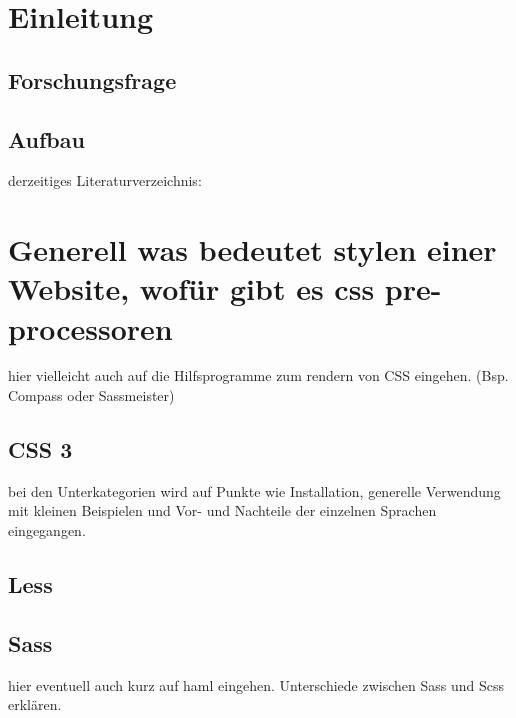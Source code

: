 \section{Einleitung}
\label{section:Introduction}


\subsection{Forschungsfrage}
\label{subsection:Coding}


\subsection{Aufbau}
derzeitiges Literaturverzeichnis:\newline
\autocite[]{Bracey.2014}\newline
\autocite[]{Coyier.2012}\newline
\autocite[]{Croom.2012}\newline
\autocite[]{Firdaus.}\newline
\autocite[]{Hixon.2011}\newline
\autocite[]{Page.2013}\newline
\autocite[]{ZingDesign.2014}\newline


\section{Generell was bedeutet stylen einer Website, wofür gibt es css pre-processoren}
\label{section:MathematicalStuff}
hier vielleicht auch auf die Hilfsprogramme zum rendern von CSS eingehen. (Bsp. Compass oder Sassmeister)


\subsection{CSS 3}
bei den Unterkategorien wird auf Punkte wie Installation, generelle Verwendung mit kleinen Beispielen und Vor- und Nachteile der einzelnen Sprachen eingegangen.

\subsection{Less}

\subsection{Sass}
hier eventuell auch kurz auf haml eingehen.
Unterschiede zwischen Sass und Scss erklären. 
